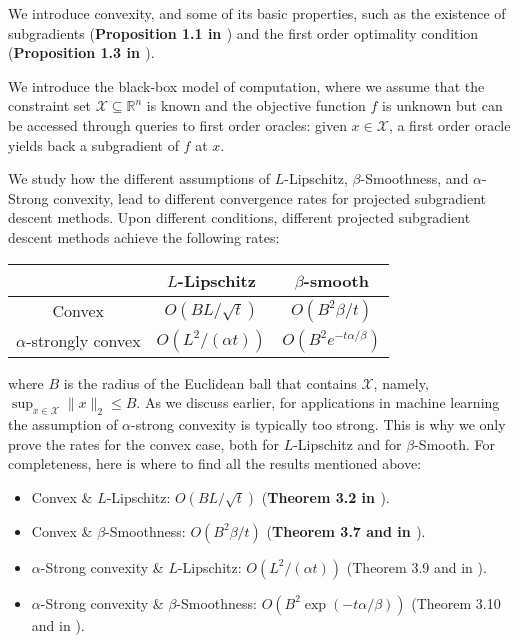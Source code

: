 We introduce convexity, and some of its basic properties, such as the existence of subgradients (\textbf{Proposition 1.1 in \cite{bubeck}}) and the first order optimality condition (\textbf{Proposition 1.3 in \cite{bubeck}}).

We introduce the black-box model of computation, where we assume that the constraint set $\mathcal{X}\subseteq\mathbb{R}^n$ is known and the objective function $f$ is unknown but can be accessed through queries to first order oracles: given $x\in\mathcal{X}$, a first order oracle yields back a subgradient of $f$ at $x$.

We study how the different assumptions of $L$-Lipschitz, $\beta$-Smoothness, and $\alpha$-Strong convexity, lead to different convergence rates for projected subgradient descent methods. Upon different conditions, different projected subgradient descent methods achieve the following rates:
\begin{center}
 \begin{tabular}{|c | c | c|}
 \hline
 & $L$-Lipschitz & $\beta$-smooth\\
 \hline
 Convex & $O(BL/\sqrt{t})$ & $O(B^2\beta/t)$\\
 \hline
 $\alpha$-strongly convex & $O(L^2/(\alpha t))$ & $O(B^2e^{-t\alpha/\beta})$\\
 \hline
\end{tabular}
\end{center}
where $B$ is the radius of the Euclidean ball that contains $\mathcal{X}$, namely, $\sup_{x\in\mathcal{X}}\|x\|_2 \le B$.
As we discuss earlier, for applications in machine learning the assumption of $\alpha$-strong convexity is typically too strong. This is why we only prove the rates for the convex case, both for $L$-Lipschitz and for $\beta$-Smooth. For completeness, here is where to find all the results mentioned above:
\begin{itemize}
	\item Convex \& $L$-Lipschitz: $O(BL/\sqrt{t})$ (\textbf{Theorem 3.2 in \cite{bubeck}}).
	\item Convex \& $\beta$-Smoothness: $O(B^2\beta/t)$  (\textbf{Theorem 3.7 and in \cite{bubeck}}).
	\item $\alpha$-Strong convexity \& $L$-Lipschitz: $O(L^2/(\alpha t))$ (Theorem 3.9 and in \cite{bubeck}).
	\item $\alpha$-Strong convexity \& $\beta$-Smoothness: $O(B^2\exp(-t\alpha/\beta))$ (Theorem 3.10 and in \cite{bubeck}).
\end{itemize}	


